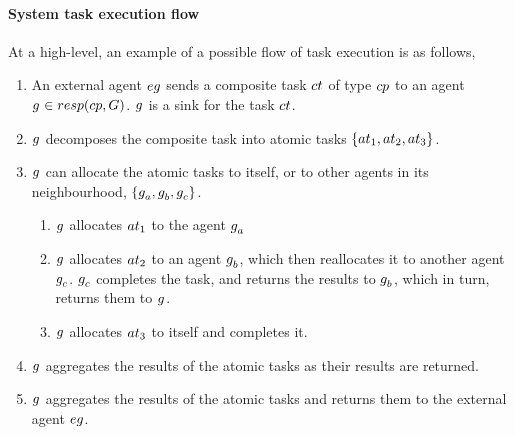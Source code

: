 \paragraph{System task execution flow}

At a high-level, an example of a possible flow of task execution is as follows,

\begin{enumerate}
	\item An external agent $\varExternalAgent{}{}$ sends a composite task $\varCompositeTask{}{}$ of type $\varCompositeTaskType{}{}$ to an agent $\varAgent{}{} \in \functionTaskResponsibilities{}{}$. $g_{}^{}$ is a sink for the task $\varCompositeTask{}{}$.
	\item $g_{}^{}$ decomposes the composite task into atomic tasks $\lbrace \varAtomicTask{1}{}, \varAtomicTask{2}{}, \varAtomicTask{3}{} \rbrace$.
	
	\item $g_{}^{}$ can allocate the atomic tasks to itself, or to other agents in its neighbourhood, $\lbrace g_{a}^{}, g_{b}^{}, g_{c}^{} \rbrace$.
	\begin{enumerate}
		\item $g_{}^{}$ allocates $\varAtomicTask{1}{}$ to the agent $g_{a}^{}$
		\item $g_{}^{}$ allocates $\varAtomicTask{2}{}$ to an agent $g_{b}^{}$, which then reallocates it to another agent $g_{c}^{}$. $g_{c}^{}$ completes the task, and returns the results  to $g_{b}^{}$, which in turn, returns them to $g_{}^{}$.
		\item $g_{}^{}$ allocates $\varAtomicTask{3}{}$ to itself and completes it.
	\end{enumerate}
	\item $g_{}^{}$ aggregates the results of the atomic tasks as their results are returned.
	\item $g_{}^{}$ aggregates the results of the atomic tasks and returns them to the external agent $\varExternalAgent{}{}$.
\end{enumerate}

